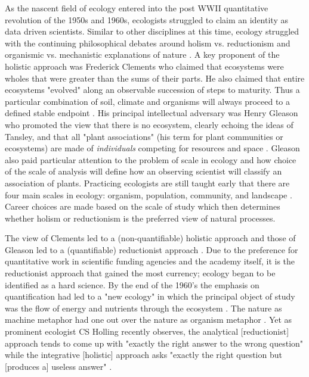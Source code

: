 As the nascent field of ecology entered into the post WWII quantitative revolution of the 1950s and 1960s, ecologists struggled to claim an identity as data driven scientists. Similar to other disciplines at this time, ecology struggled with the continuing philosophical debates around holism vs. reductionism and organismic vs. mechanistic explanations of nature \citep{barbour_1996}. A key proponent of the holistic approach was Frederick Clements who claimed that ecosystems were wholes that were greater than the sums of their parts. He also claimed that entire ecosystems "evolved" along an observable succession of steps to maturity. Thus a particular combination of soil, climate and organisms will always proceed to a defined stable endpoint \citep{clements_1936}. His principal intellectual adversary was Henry Gleason who promoted the view that there is no ecosystem, clearly echoing the ideas of Tansley, and that all "plant associations" (his term for plant communities or ecosystems) are made of \textit{individuals} competing for resources and space \citep{gleason_1939}.  Gleason also paid particular attention to the problem of scale in ecology and how choice of the scale of analysis will define how an observing scientist will classify an association of plants. Practicing ecologists are still taught early that there are four main scales in ecology: organism, population, community, and landscape \citep{odum_1953}. Career choices are made based on the scale of study which then determines whether holism or reductionism is the preferred view of natural processes.

The view of Clements led to a (non-quantifiable) holistic approach and those of Gleason led to a (quantifiable) reductionist approach \citep{barbour_1996,worster_1977}. Due to the preference for quantitative work in scientific funding agencies and the academy itself, it is the reductionist approach that gained the most currency; ecology began to be identified as a hard science. By the end of the 1960's the emphasis on quantification had led to a "new ecology" in which the principal object of study was the flow of energy and nutrients through the ecosystem \citep{worster_1977,barbour_1996}. The nature as machine metaphor had one out over the nature as organism metaphor \citep{hagen_1992}. Yet as prominent ecologist CS Holling recently observes, the analytical [reductionist] approach tends to come up with "exactly the right answer to the wrong question" while the integrative [holistic] approach asks "exactly the right question but [produces a] useless answer" \citep[][p. 3]{holling_1998}.

